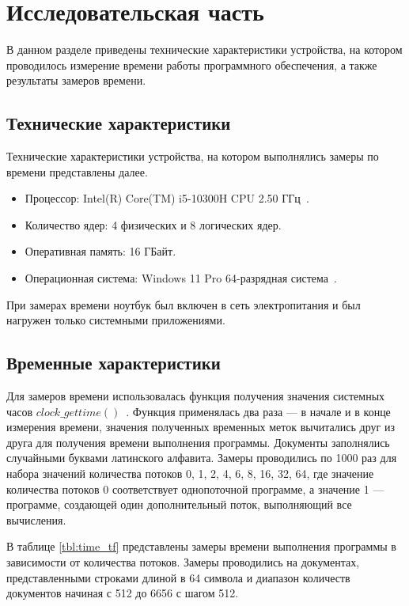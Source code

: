 \chapter{Исследовательская часть}

В данном разделе приведены технические характеристики устройства, на котором проводилось измерение времени работы программного обеспечения, а также результаты замеров времени.

\section{Технические характеристики}

Технические характеристики устройства, на котором выполнялись замеры по времени представлены далее.

\begin{itemize}[label=---]
	\item Процессор: Intel(R) Core(TM) i5-10300H CPU 2.50 ГГц~\cite{intel}.
	\item Количество ядер: 4 физических и 8 логических ядер.
	\item Оперативная память: 16 ГБайт.
	\item Операционная система: Windows 11 Pro 64-разрядная система~\cite{windows}.
\end{itemize}

При замерах времени ноутбук был включен в сеть электропитания и был нагружен только системными приложениями.

\section{Временные характеристики}

Для замеров времени использовалась функция получения значения системных часов $clock\_gettime()$~\cite{c-lang-time}. Функция применялась два раза --- в начале и в конце измерения времени, значения полученных временных меток вычитались друг из друга для получения времени выполнения программы.
Документы заполнялись случайными буквами латинского алфавита.
Замеры проводились по 1000 раз для набора значений количества потоков 0, 1, 2, 4, 6, 8, 16, 32, 64, где значение количества потоков 0 соответствует однопоточной программе, а значение 1 — программе, создающей один дополнительный поток, выполняющий все вычисления. 

В таблице  \ref{tbl:time_tf} представлены замеры времени выполнения программы в зависимости от количества потоков. Замеры проводились на документах, представленными строками длиной в 64 символа и диапазон количеств документов начиная с 512 до 6656 с шагом 512.

